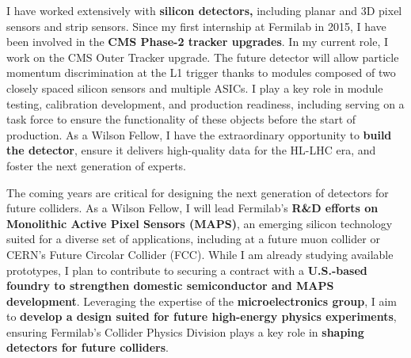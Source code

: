 {\begin{flushleft}
I have worked extensively with {\bf silicon detectors,} including planar and 3D pixel sensors and strip sensors. Since my first internship at Fermilab in 2015, I have been involved in the {\bf CMS Phase-2 tracker upgrades}. In my current role, I work on the CMS Outer Tracker upgrade. The future detector will allow particle momentum discrimination at the L1 trigger thanks to modules composed of two closely spaced silicon sensors and multiple ASICs. I play a key role in module testing, calibration development, and production readiness, including serving on a task force to ensure the functionality of these objects before the start of production. As a Wilson Fellow, I have the extraordinary opportunity to {\bf build the detector}, ensure it delivers high-quality data for the HL-LHC era, and foster the next generation of experts.


The coming years are critical for designing the next generation of detectors for future colliders. As a Wilson Fellow, I will lead Fermilab’s {\bf R\&D efforts on Monolithic Active Pixel Sensors (MAPS)}, an emerging silicon technology suited for a diverse set of applications, including at a future muon collider or CERN's Future Circolar Collider (FCC). While I am already studying available prototypes, I plan to contribute to securing a contract with a {\bf U.S.-based foundry to strengthen domestic semiconductor and MAPS development}. Leveraging the expertise of the {\bf microelectronics group}, I aim to {\bf develop a design suited for future high-energy physics experiments}, ensuring Fermilab’s Collider Physics Division plays a key role in {\bf shaping detectors for future colliders}.



\end{flushleft}}
